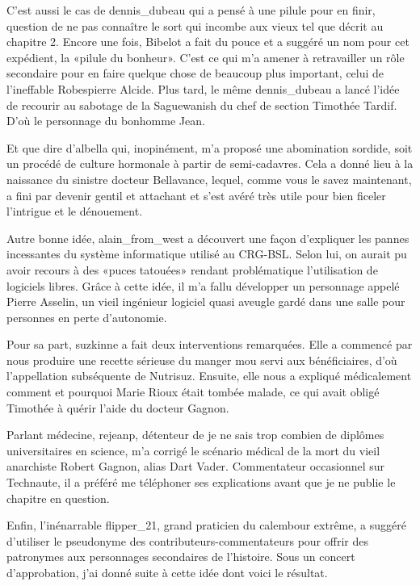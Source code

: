 \begin{Postface}
C’est aussi le cas de dennis_dubeau qui a pensé à une pilule pour en finir, question de ne pas connaître le sort qui incombe aux vieux tel que décrit au chapitre 2. Encore une fois, Bibelot a fait du pouce et a suggéré un nom pour cet expédient, la «pilule du bonheur». C’est ce qui m’a amener à retravailler un rôle secondaire pour en faire quelque chose de beaucoup plus important, celui de l’ineffable Robespierre Alcide. Plus tard, le même dennis_dubeau a lancé l’idée de recourir au sabotage de la Saguewanish du chef de section Timothée Tardif. D’où le personnage du bonhomme Jean.

Et que dire d’albella qui, inopinément, m’a proposé une abomination sordide, soit un procédé de culture hormonale à partir de semi-cadavres. Cela a donné lieu à la naissance du sinistre docteur Bellavance, lequel, comme vous le savez maintenant, a fini par devenir gentil et attachant et s’est avéré très utile pour bien ficeler l’intrigue et le dénouement.

Autre bonne idée, alain_from_west a découvert une façon d’expliquer les pannes incessantes du système informatique utilisé au CRG-BSL. Selon lui, on aurait pu avoir recours à des «puces tatouées» rendant problématique l’utilisation de logiciels libres. Grâce à cette idée, il m’a fallu développer un personnage appelé Pierre Asselin, un vieil ingénieur logiciel quasi aveugle gardé dans une salle pour personnes en perte d’autonomie.

Pour sa part, suzkinne a fait deux interventions remarquées. Elle a commencé par nous produire une recette sérieuse du manger mou servi aux bénéficiaires, d’où l’appellation subséquente de Nutrisuz. Ensuite, elle nous a expliqué médicalement comment et pourquoi Marie Rioux était tombée malade, ce qui avait obligé Timothée à quérir l’aide du docteur Gagnon.

Parlant médecine, rejeanp, détenteur de je ne sais trop combien de diplômes universitaires en science, m’a corrigé le scénario médical de la mort du vieil anarchiste Robert Gagnon, alias Dart Vader. Commentateur occasionnel sur Technaute, il a préféré me téléphoner ses explications avant que je ne publie le chapitre en question.

Enfin, l’inénarrable flipper_21, grand praticien du calembour extrême, a suggéré d’utiliser le pseudonyme des contributeurs-commentateurs pour offrir des patronymes aux personnages secondaires de l’histoire. Sous un concert d’approbation, j’ai donné suite à cette idée dont voici le résultat.


\end{Postface}
